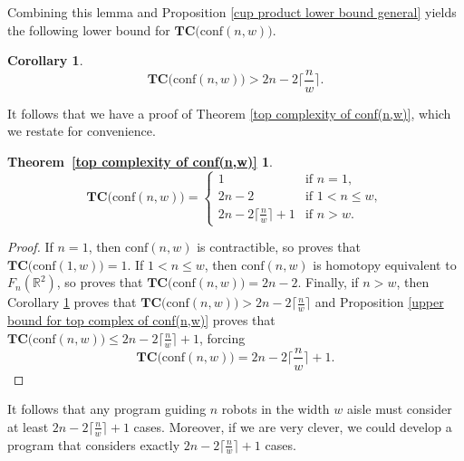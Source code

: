 \documentclass[pagebackref,colorlinks,citecolor=blue,linkcolor=blue,urlcolor=blue,filecolor=blue]{article}
\newtheorem*{T1}{Theorem~\ref{top complexity of conf(n,w)}}
\newtheorem{cor}[thm]{Corollary}
\theoremstyle{definition}\newtheorem{definition}[thm]{Definition}
\theoremstyle{definition}
\newcommand{\thmtext}{\[
\textbf{TC}\big(\text{conf}(n,w)\big)=\begin{cases}1&\mbox{if }n=1,\\
2n-2&\mbox{if }1<n\le w,\\
2n-2\big\lceil\frac{n}{w}\big\rceil+1&\mbox{if }n>w.
\end{cases}
\]}
\newcommand{\R}{\ensuremath{\mathbb{R}}}
\begin{document}
Combining this lemma and Proposition \ref{cup product lower bound general} yields the following lower bound for $\textbf{TC}\big(\text{conf}(n,w)\big)$.

\begin{cor}\label{lower bound for tcconfnw}
\[
\textbf{TC}\big(\text{conf}(n,w)\big)>2n-2\Big\lceil\frac{n}{w}\Big\rceil.
\]
\end{cor}

It follows that we have a proof of Theorem \ref{top complexity of conf(n,w)}, which we restate for convenience.

\begin{T1}
  \thmtext
\end{T1} 

\begin{proof}
If $n=1$, then $\text{conf}(n,w)$ is contractible, so \cite[Theorem 1]{farber2003topological} proves that $\textbf{TC}\big(\text{conf}(1,w)\big)=1$.
If $1<n\le w$, then $\text{conf}(n,w)$ is homotopy equivalent to $F_{n}(\R^{2})$, so \cite[Theorem 1]{farber2002topological} proves that $\textbf{TC}\big(\text{conf}(n,w)\big)=2n-2$.
Finally, if $n>w$, then Corollary \ref{lower bound for tcconfnw} proves that $\textbf{TC}\big(\text{conf}(n,w)\big)>2n-2\big\lceil\frac{n}{w}\big\rceil$ and Proposition \ref{upper bound for top complex of conf(n,w)} proves that $\textbf{TC}\big(\text{conf}(n,w)\big)\le2n-2\big\lceil\frac{n}{w}\big\rceil+1$, forcing
\[
\textbf{TC}\big(\text{conf}(n,w)\big)=2n-2\Big\lceil\frac{n}{w}\Big\rceil+1.
\]
\end{proof}

It follows that any program guiding $n$ robots in the width $w$ aisle must consider at least $2n-2\big\lceil\frac{n}{w}\big\rceil+1$ cases.
Moreover, if we are very clever, we could develop a program that considers exactly $2n-2\big\lceil\frac{n}{w}\big\rceil+1$ cases.



\end{document}
